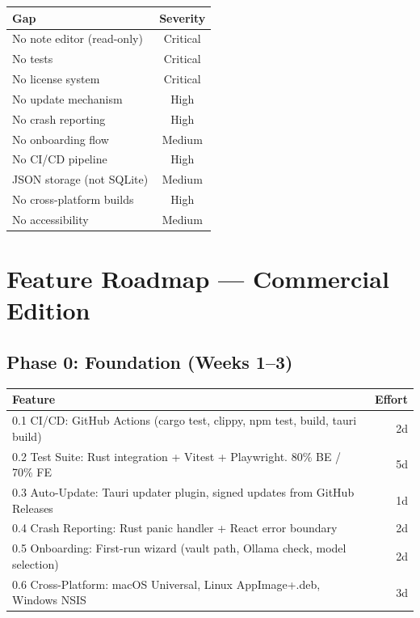 \documentclass[11pt,a4paper]{article}
\begin{document}
\begin{table}[h]\centering\small
\begin{tabularx}{\textwidth}{Xc}
\toprule
\textbf{Gap} & \textbf{Severity} \\
\midrule
No note editor (read-only) & Critical \\
No tests & Critical \\
No license system & Critical \\
No update mechanism & High \\
No crash reporting & High \\
No onboarding flow & Medium \\
No CI/CD pipeline & High \\
JSON storage (not SQLite) & Medium \\
No cross-platform builds & High \\
No accessibility & Medium \\
\bottomrule
\end{tabularx}
\end{table}

\section{Feature Roadmap --- Commercial Edition}

\subsection{Phase 0: Foundation (Weeks 1--3)}

\begin{table}[h]\centering\small
\begin{tabularx}{\textwidth}{Xr}
\toprule
\textbf{Feature} & \textbf{Effort} \\
\midrule
0.1 CI/CD: GitHub Actions (cargo test, clippy, npm test, build, tauri build) & 2d \\
0.2 Test Suite: Rust integration + Vitest + Playwright. 80\% BE / 70\% FE & 5d \\
0.3 Auto-Update: Tauri updater plugin, signed updates from GitHub Releases & 1d \\
0.4 Crash Reporting: Rust panic handler + React error boundary & 2d \\
0.5 Onboarding: First-run wizard (vault path, Ollama check, model selection) & 2d \\
0.6 Cross-Platform: macOS Universal, Linux AppImage+.deb, Windows NSIS & 3d \\
\bottomrule
\end{tabularx}
\end{table}
\end{document}
